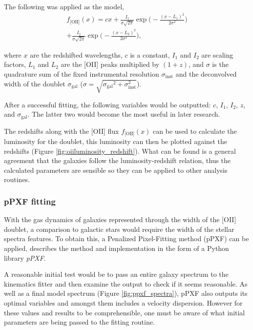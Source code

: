 \documentclass[12pt, twocolumn]{revtex4-1}    %
\begin{document}
The following was applied as the model,
\begin{multline}
f_{\text{[OII]}}(x) = cx + \frac{I_1}{\sigma \sqrt{2\pi}} \exp{\Bigg(-\frac{(x-L_1)^2}{2\sigma^2}\Bigg)} \\
+ \frac{I_2}{\sigma \sqrt{2\pi}} \exp{\Bigg(-\frac{(x-L_2)^2}{2\sigma^2}\Bigg)},
\label{eqn:doublet}
\end{multline} 

where $x$ are the redshifted wavelengths, ${c}$ is a constant, ${I_1}$ and ${I_2}$ are scaling factors, $L_1$ and $L_2$ are the [OII] peaks multiplied by $(1+{z})$, and $\sigma$ is the quadrature sum of the fixed instrumental resolution $\sigma_{\text{inst}}$ and the deconvolved width of the doublet $\sigma_{\text{gal}}$ ($\sigma=\sqrt{{\sigma_{\text{gal}}}^2 + \sigma_{\text{inst}}^2}$).



After a successful fitting, the following variables would be outputted: $c$, $I_1$, $I_2$, $z$, and $\sigma_{\text{gal}}$. The latter two would become the most useful in later research. 

The redshifts along with the [OII] flux $f_{\text{[OII]}}(x)$ can be used to calculate the luminosity for the doublet, this luminosity can then be plotted against the redshifts (Figure \ref{fig:oiiluminosity_redshift}). What can be found is a general agreement that the galaxies follow the luminosity-redshift relation, thus the calculated parameters are sensible so they can be applied to other analysis routines.

\subsubsection*{pPXF fitting}

With the gas dynamics of galaxies represented through the width of the [OII] doublet, a comparison to galactic stars would require the width of the stellar spectra features. To obtain this, a Penalized Pixel-Fitting method (pPXF) can be applied, \cite{cappaellari_ppxf} describes the method and implementation in the form of a Python library \textit{pPXF}.

A reasonable initial test would be to pass an entire galaxy spectrum to the kinematics fitter and then examine the output to check if it seems reasonable. As well as a final model spectrum (Figure \ref{fig:ppxf_spectra}), pPXF also outputs its optimal variables and amongst them includes a velocity dispersion. However for these values and results to be comprehensible, one must be aware of what initial parameters are being passed to the fitting routine. 
\end{document}
